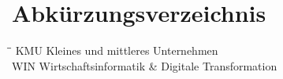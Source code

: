 \section*{Abkürzungsverzeichnis}

\begin{tabbing}
\hspace*{4cm}\=\hspace*{3cm}\= \kill
KMU     \> Kleines und mittleres Unternehmen \\
WIN     \> Wirtschaftsinformatik \& Digitale Transformation

\end{tabbing}
